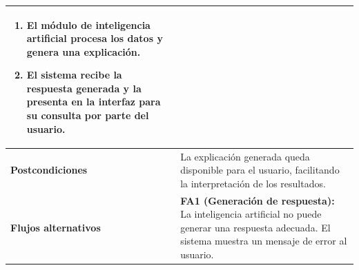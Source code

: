 \begin{longtable}{|p{4cm}|p{10cm}|}
\begin{enumerate}
    \item El módulo de inteligencia artificial procesa los datos y genera una explicación.
    
    \item El sistema recibe la respuesta generada y la presenta en la interfaz para su consulta por parte del usuario.
\end{enumerate} \\ \hline

\textbf{Postcondiciones} & 
La explicación generada queda disponible para el usuario, facilitando la interpretación de los resultados. \\ \hline

\textbf{Flujos alternativos} & 
\textbf{FA1 (Generación de respuesta):} La inteligencia artificial no puede generar una respuesta adecuada. El sistema muestra un mensaje de error al usuario. \\ \hline

\end{longtable}

    \newpage
